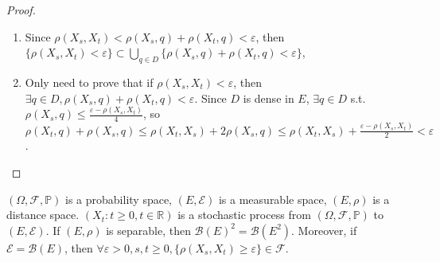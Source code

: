 \documentclass{ctexart}
\begin{document}
\begin{proof}
  \begin{enumerate}
    \item Since \(\rho(X_s,X_t)< \rho(X_s,q)+\rho(X_t,q) < \varepsilon\), then
      \(\{\rho(X_s, X_t) < \varepsilon\} \subset \bigcup_{q \in D}\{\rho(X_s, q)+\rho(X_t, q) < \varepsilon\}\),
    \item Only need to prove that if \(\rho(X_s, X_t) < \varepsilon\),
      then \(\exists q \in D, \rho(X_s,q)+\rho(X_t,q) < \varepsilon\).
      Since \(D\) is dense in \(E\), \(\exists q \in D\) s.t.
      \(\rho(X_s,q) \leq \frac{\varepsilon - \rho(X_s,X_t)}{4}\), so
      \(\rho(X_t,q)+\rho(X_s,q) \leq \rho(X_t,X_s)+2\rho(X_s,q) \leq \rho(X_t,X_s)+ \frac{\varepsilon - \rho(X_s,X_t)}{2} < \varepsilon \).
  \end{enumerate}

\end{proof}
\begin{lemma}\label{lem:2.2}
  \((\Omega,\mathscr{F},\mathbb{P})\) is a probability space, \((E,\mathscr{E})\) is a
  measurable space, \((E,\rho)\) is a distance space.
  \((X_t:t \geq 0, t \in \mathbb{R})\) is a stochastic process from
  \((\Omega,\mathscr{F},\mathbb{P})\) to \((E,\mathscr{E})\).
  If \((E, \rho)\) is separable, then \(\mathscr{B}(E)^2= \mathscr{B}(E^2)\).
  Moreover, if \(\mathscr{E} = \mathscr{B}(E)\), then \(\forall \varepsilon>0, s,t \geq 0, \{\rho(X_s,X_t) \geq \varepsilon\} \in \mathscr{F}\).

\end{lemma}
\end{document}
